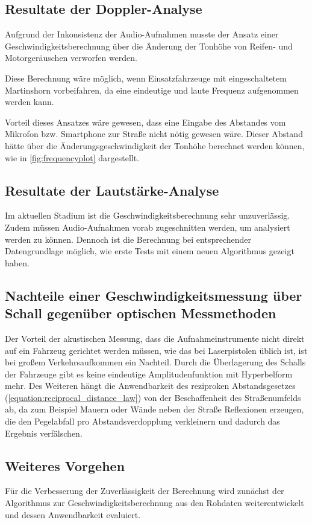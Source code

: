 \subsection{Resultate der Doppler-Analyse}
Aufgrund der Inkonsistenz der Audio-Aufnahmen musste der Ansatz einer Geschwindigkeitsberechnung über die Änderung der Tonhöhe von Reifen- und Motorgeräuschen verworfen werden.

Diese Berechnung wäre möglich, wenn Einsatzfahrzeuge mit eingeschaltetem Martinshorn vorbeifahren, da eine eindeutige und laute Frequenz aufgenommen werden kann.

Vorteil dieses Ansatzes wäre gewesen, dass eine Eingabe des Abstandes vom Mikrofon bzw. Smartphone zur Straße nicht nötig gewesen wäre. Dieser Abstand hätte über die Änderungsgeschwindigkeit der Tonhöhe berechnet werden können, wie in \autoref{fig:frequencyplot} dargestellt.

\subsection{Resultate der Lautstärke-Analyse}
Im aktuellen Stadium ist die Geschwindigkeitsberechnung sehr unzuverlässig. Zudem müssen Audio-Aufnahmen vorab zugeschnitten werden, um analysiert werden zu können. Dennoch ist die Berechnung bei entsprechender Datengrundlage möglich, wie erste Tests mit einem neuen Algorithmus gezeigt haben.

\subsection{Nachteile einer Geschwindigkeitsmessung über Schall gegenüber optischen Messmethoden}
Der Vorteil der akustischen Messung, dass die Aufnahmeinstrumente nicht direkt auf ein Fahrzeug gerichtet werden müssen, wie das bei Laserpistolen üblich ist, ist bei großem Verkehrsaufkommen ein Nachteil. Durch die Überlagerung des Schalls der Fahrzeuge gibt es keine eindeutige Amplitudenfunktion mit Hyperbelform mehr.
Des Weiteren hängt die Anwendbarkeit des reziproken Abstandsgesetzes (\autoref{equation:reciprocal_distance_law}) von der Beschaffenheit des Straßenumfelds ab, da zum Beispiel Mauern oder Wände neben der Straße Reflexionen erzeugen, die den Pegelabfall pro Abstandsverdopplung verkleinern und dadurch das Ergebnis verfälschen. \cite{WikiSchalldruckAbstand}

\subsection{Weiteres Vorgehen}
Für die Verbesserung der Zuverlässigkeit der Berechnung wird zunächst der Algorithmus zur Geschwindigkeitsberechnung aus den Rohdaten weiterentwickelt und dessen Anwendbarkeit evaluiert.


